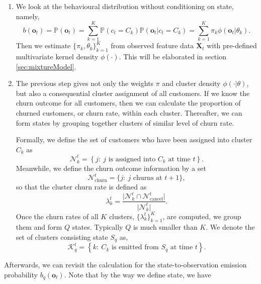 \begin{enumerate}
\item We look at the behavioural distribution without conditioning on state, namely,
\begin{equation}
b(\mathbf{o}_t) = \mathbb{P} (\mathbf{o}_t) = \sum_{k=1}^K \mathbb{P} (c_t = C_k) \mathbb{P} (\mathbf{o}_t | c_t = C_k) = \sum_{k=1}^K \pi_k \phi(\mathbf{o}_t | \theta_k).
\label{eq:bo}
\end{equation}
Then we estimate $\{ \pi_k, \theta_k \}_{k=1}^K$ from observed feature data $\mathbf{X}_t$ with pre-defined multivariate kernel density $\phi(\cdot)$. This will be elaborated in section \ref{sec:mixtureModel}.

\item The previous step gives not only the weights $\pi$ and cluster density $\phi(\cdot | \theta)$, but also a consequential cluster assignment of all customers. If we know the churn outcome for all customers, then we can calculate the proportion of churned customers, or churn rate, within each cluster. Thereafter, we can form states by grouping together clusters of similar level of churn rate.

Formally, we define the set of customers who have been assigned into cluster $C_k$ as
\begin{equation}
\mathcal{N}_k^t = \left\lbrace j :~ j \text{ is assigned into } C_k \text{ at time } t \right\rbrace.
\end{equation}
Meanwhile, we define the churn outcome information by a set
\begin{equation}
\mathcal{N}_\text{churn}^t = \{j: ~j \text{ churns at } t+1 \},
\end{equation}
so that the cluster churn rate is defined as
\begin{equation}
\lambda_k^t = \frac{\vert \mathcal{N}_k^t \cap \mathcal{N}_\text{cancel}^t \vert}{\vert  \mathcal{N}_k^t \vert}.
\end{equation}
Once the churn rates of all $K$ clusters, $\{ \lambda_k^t \}_{k=1}^K$, are computed, we group them and form $Q$ states. Typically $Q$ is much smaller than $K$. We denote the set of clusters consisting state $S_q$ as,
\begin{equation}
\mathcal{K}_q^t = \left\lbrace k :~ C_k \text{ is emitted from } S_q \text{ at time } t \right\rbrace.
\end{equation}
\end{enumerate}
Afterwards, we can revisit the calculation for the state-to-observation emission probability $b_q(\mathbf{o}_t)$. Note that by the way we define state, we have
